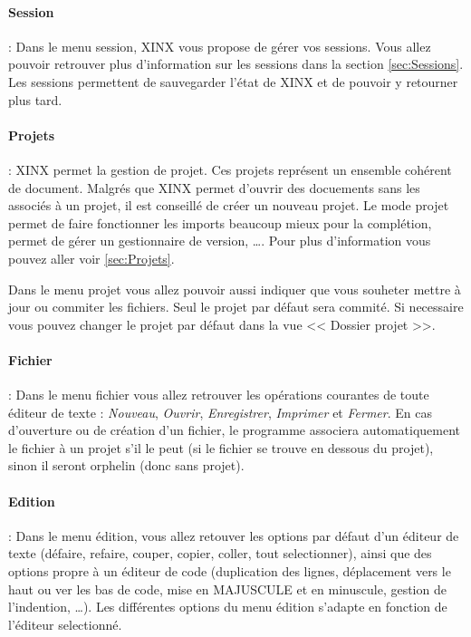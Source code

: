 \documentclass[a4paper,10pt,twoside]{book}
\begin{document}
\paragraph{Session} : Dans le menu session, XINX vous propose de gérer vos sessions. Vous allez pouvoir retrouver plus d'information sur les sessions dans la section \ref{sec:Sessions}. Les sessions permettent de sauvegarder l'état de XINX et de pouvoir y retourner plus tard.

\paragraph{Projets} : XINX permet la gestion de projet. Ces projets représent un ensemble cohérent de document. Malgrés que XINX permet d'ouvrir des docuements sans les associés à un projet, il est conseillé de créer un nouveau projet. Le mode projet permet de faire fonctionner les imports beaucoup mieux pour la complétion, permet de gérer un gestionnaire de version, \dots. Pour plus d'information vous pouvez aller voir \ref{sec:Projets}. 

Dans le menu projet vous allez pouvoir aussi indiquer que vous souheter mettre à jour ou commiter les fichiers. Seul le projet par défaut sera commité. Si necessaire vous pouvez changer le projet par défaut dans la vue << Dossier projet >>.

\paragraph{Fichier} : Dans le menu fichier vous allez retrouver les opérations courantes de toute éditeur de texte : \emph{Nouveau}, \emph{Ouvrir}, \emph{Enregistrer}, \emph{Imprimer} et \emph{Fermer}. En cas d'ouverture ou de création d'un fichier, le programme associera automatiquement le fichier à un projet s'il le peut (si le fichier se trouve en dessous du projet), sinon il seront orphelin (donc sans projet).

\paragraph{Edition} : Dans le menu édition, vous allez retouver les options par défaut d'un éditeur de texte (défaire, refaire, couper, copier, coller, tout selectionner), ainsi que des options propre à un éditeur de code (duplication des lignes, déplacement vers le haut ou ver les bas de code, mise en MAJUSCULE et en minuscule, gestion de l'indention, \dots). Les différentes options du menu édition s'adapte en fonction de l'éditeur selectionné.
\end{document}
